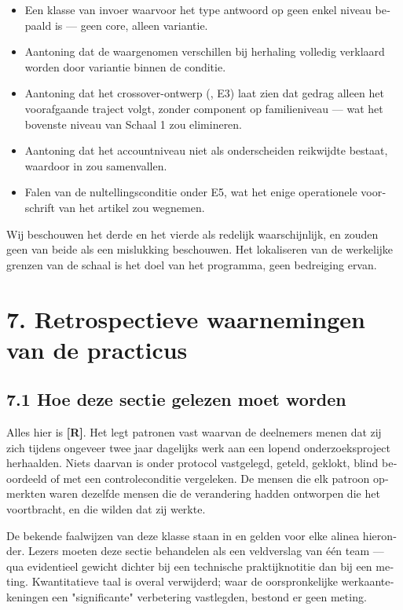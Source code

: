 \begin{dutch}
\begin{itemize}
  \item Een klasse van invoer waarvoor het type antwoord op geen enkel niveau bepaald is — geen core, alleen variantie.
  \item Aantoning dat de waargenomen verschillen bij herhaling volledig verklaard worden door variantie binnen de conditie.
  \item Aantoning dat het crossover-ontwerp (, E3) laat zien dat gedrag alleen het voorafgaande traject volgt, zonder component op familieniveau — wat het bovenste niveau van Schaal 1 zou elimineren.
  \item Aantoning dat het accountniveau niet als onderscheiden reikwijdte bestaat, waardoor  in  zou samenvallen.
  \item Falen van de nultellingsconditie onder E5, wat het enige operationele voorschrift van het artikel zou wegnemen.
\end{itemize}
Wij beschouwen het derde en het vierde als redelijk waarschijnlijk, en zouden geen van beide als een mislukking beschouwen. Het lokaliseren van de werkelijke grenzen van de schaal is het doel van het programma, geen bedreiging ervan.


\section*{7. Retrospectieve waarnemingen van de practicus}
\label{sec:nl:7}


\subsection*{7.1 Hoe deze sectie gelezen moet worden}
\label{sec:nl:7.1}

Alles hier is \textbf{[R]}. Het legt patronen vast waarvan de deelnemers menen dat zij zich tijdens ongeveer twee jaar dagelijks werk aan een lopend onderzoeksproject herhaalden. Niets daarvan is onder protocol vastgelegd, geteld, geklokt, blind beoordeeld of met een controleconditie vergeleken. De mensen die elk patroon opmerkten waren dezelfde mensen die de verandering hadden ontworpen die het voortbracht, en die wilden dat zij werkte.

De bekende faalwijzen van deze klasse staan in  en gelden voor elke alinea hieronder. Lezers moeten deze sectie behandelen als een veldverslag van één team — qua evidentieel gewicht dichter bij een technische praktijknotitie dan bij een meting. Kwantitatieve taal is overal verwijderd; waar de oorspronkelijke werkaantekeningen een "significante" verbetering vastlegden, bestond er geen meting.


\end{dutch}
